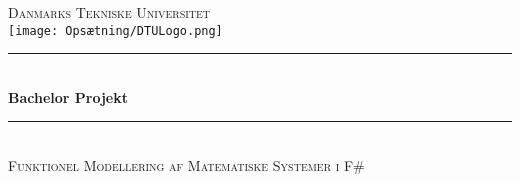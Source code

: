 \begin{titlepage} %
	\newcommand{\HRule}{\rule{\linewidth}{0.5mm}} %
	
	\center %
	   
	
	
	\textsc{\LARGE Danmarks Tekniske Universitet}\\[1.5cm] %
	
    \texttt{[image: Opsætning/DTULogo.png]}\\
	
	
	
	\HRule\\[0.5cm]
	
	{\huge\bfseries Bachelor Projekt}\\[0.4cm] %

	\HRule\\[0.5cm]
	
	\textsc{\Large Funktionel Modellering af Matematiske Systemer i F\#}\\[1cm] %
	
    \vfill\vfill\vfill
    \begin{minipage}{\textwidth}
		\begin{flushleft}
            \centering


\end{flushleft}
\end{minipage}
\end{titlepage}
